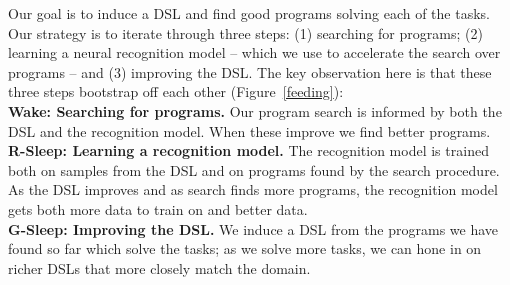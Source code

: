 \documentclass{article}
\newcommand{\system}{\textsc{DreamCoder}~}
\begin{document}
Our goal  is to induce a DSL and find good programs solving each of the tasks.
Our strategy is to iterate through three steps: (1) searching for programs; (2) learning a neural recognition model -- which we use
to accelerate the search over programs -- and (3) improving the DSL.
The key observation here is that these three steps bootstrap off each other (Figure~\ref{feeding}):
\\\noindent \textbf{Wake: Searching for programs.}  Our program search  is informed by both the DSL and the recognition model.
When these improve we find better programs.
\\\noindent\textbf{R-Sleep: Learning a recognition model.} The recognition model is trained both on samples from the DSL and on programs found by the search procedure. As the DSL improves and as search finds more programs, the recognition model gets both more data to train on and better data.
\\\noindent\textbf{G-Sleep: Improving the DSL.} We induce a DSL from the programs we have found so far which solve the tasks;
  as we solve more tasks, we can hone in on richer DSLs that more closely match the domain.

\end{document}
